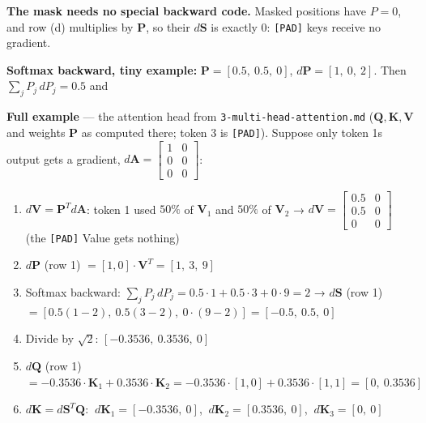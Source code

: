 \documentclass[11pt,a4paper,oneside]{report}
\providecommand{\tightlist}{\setlength{\itemsep}{0pt}\setlength{\parskip}{0pt}}
\begin{document}
\textbf{The mask needs no special backward code.} Masked positions have \(P = 0\), and row (d) multiplies by \(\mathbf{P}\), so their \(d\mathbf{S}\) is exactly \(0\): \texttt{{[}PAD{]}} keys receive no gradient.

\textbf{Softmax backward, tiny example:} \(\mathbf{P} = [0.5,\ 0.5,\ 0]\), \(d\mathbf{P} = [1,\ 0,\ 2]\). Then \(\sum_j P_j\, dP_j = 0.5\) and

\begin{center}\end{center}

\textbf{Full example} --- the attention head from \texttt{3-multi-head-attention.\allowbreak{}md} (\(\mathbf{Q}, \mathbf{K}, \mathbf{V}\) and weights \(\mathbf{P}\) as computed there; token 3 is \texttt{{[}PAD{]}}). Suppose only token 1\textquotesingle s output gets a gradient, \(d\mathbf{A} = \begin{bmatrix} 1 & 0 \\ 0 & 0 \\ 0 & 0 \end{bmatrix}\):

\begin{enumerate}
\def\labelenumi{\arabic{enumi}.}
\tightlist
\item
  \(d\mathbf{V} = \mathbf{P}^T d\mathbf{A}\): token 1 used \(50\%\) of \(\mathbf{V}_1\) and \(50\%\) of \(\mathbf{V}_2\) →
  \(d\mathbf{V} = \begin{bmatrix} 0.5 & 0 \\ 0.5 & 0 \\ 0 & 0 \end{bmatrix}\) (the \texttt{{[}PAD{]}} Value gets nothing)
\item
  \(d\mathbf{P}\) (row 1) \(= [1, 0] \cdot \mathbf{V}^T = [1,\ 3,\ 9]\)
\item
  Softmax backward: \(\sum_j P_j\, dP_j = 0.5 \cdot 1 + 0.5 \cdot 3 + 0 \cdot 9 = 2\) →
  \(d\mathbf{S}\) (row 1) \(= [0.5(1 - 2),\ 0.5(3 - 2),\ 0 \cdot (9 - 2)] = [-0.5,\ 0.5,\ 0]\)
\item
  Divide by \(\sqrt{2}\): \([-0.3536,\ 0.3536,\ 0]\)
\item
  \(d\mathbf{Q}\) (row 1) \(= -0.3536 \cdot \mathbf{K}_1 + 0.3536 \cdot \mathbf{K}_2 = -0.3536 \cdot [1, 0] + 0.3536 \cdot [1, 1] = [0,\ 0.3536]\)
\item
  \(d\mathbf{K} = d\mathbf{S}^T \mathbf{Q}\): \(\ d\mathbf{K}_1 = [-0.3536,\ 0]\), \(\ d\mathbf{K}_2 = [0.3536,\ 0]\), \(\ d\mathbf{K}_3 = [0,\ 0]\)
\end{enumerate}
\end{document}
